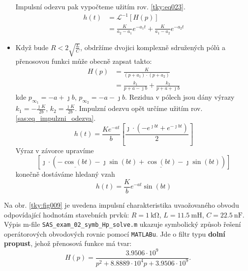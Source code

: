 \begin{mdframed}[style=mdexam]
\begin{example}
\begin{itemize}[leftmargin=12pt,noitemsep]
\begin{equation*}
            \end{equation*}
            Impulsní odezvu pak vypočteme užitím rov. \ref{tky:eq023}.
            \begin{align*}
              h(t)&=\mathcal{L}^{-1}[H(p)]               \\
                  &=\frac{K}{a_2-a_1}e^{-a_1t}+\frac{K}{a_1-a_2}e^{-a_2t}
            \end{align*}
      \item Když bude $R<2\sqrt{\frac{L}{C}}$, obdržíme dvojici komplexně sdružených pólů a
            přenosovou funkci může obecně zapsat takto:
            \begin{align*}
              H(p)&=\frac{K}{(p+a_1)\cdot(p+a_2)}            \\
                  &=\frac{k_1}{p+a-\jmath b}+\frac{k_2}{p+a+\jmath b}
            \end{align*}
            kde $p_{\infty_1}=-a+\jmath b$, $p_{\infty_2}=-a-\jmath b$. Rezidua v pólech jsou dány
            výrazy $k_1=-\frac{\jmath K}{2b}$, $k_2=\frac{\jmath K}{2b}$. Impulzní odezvu opět
            určíme užitím rov. \ref{sas:eq_impulzni_odezva}.
            \begin{equation*}
              h(t) = \frac{Ke^{-at}}{b}
                     \left[\dfrac{\jmath\cdot\left(-e^{\jmath bt}+e^{-\jmath bt}\right)}{2}\right]
            \end{equation*}
            Výraz v závorce upravíme
            \begin{equation*}
              \left[\jmath\cdot\left(\underline{-\cos(bt)}-\jmath\sin(bt) + 
                                     \underline{\cos(bt)} -\jmath\sin(bt)
                               \right)
              \right]                                                     
            \end{equation*}
            konečně dostáváme hledaný vzah
            \begin{equation*}              
              h(t) = \frac{K}{b}e^{-at}\sin(bt)                                   
            \end{equation*}
    \end{itemize}
    
    Na obr. \ref{tky:fig009} je uvedena impulsní charakteristika uvaožovaného obvodu odpovídající
    hodnotám stavebních prvků: \(R=\SI{1}{\kohm}\), \(L=\SI{11.5}{\milli\henry}\),
    \(C=\SI{22.5}{\nano\farad}\). Výpis m-file \texttt{SAS\_exam\_02\_symb\_Hp\_solve.m} ukazuje
    symbolický způsob řešení operátorových obvodových rovnic pomocí \texttt{MATLABu}. Jde o filtr
    typu \textbf{dolní propust}, jehož přenosová funkce má tvar:
    $$H(p)= \frac{3.9506\cdot10^9}{p^2+8.8889\cdot10^4p+3.9506\cdot10^9}.$$


\end{example}
\end{mdframed}
